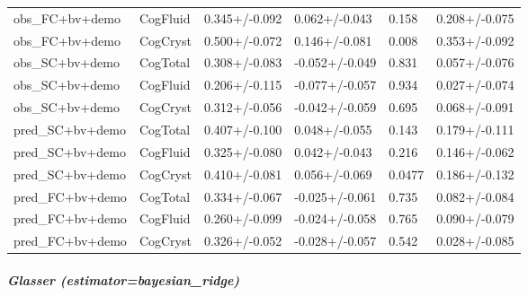{\begin{longtable}[]{@{}llllll@{}}
obs\_FC+bv+demo & CogFluid & 0.345+/-0.092 & 0.062+/-0.043 & 0.158 & 0.208+/-0.075 \\
obs\_FC+bv+demo & CogCryst & 0.500+/-0.072 & 0.146+/-0.081 & 0.008 & 0.353+/-0.092 \\
obs\_SC+bv+demo & CogTotal & 0.308+/-0.083 & -0.052+/-0.049 & 0.831 & 0.057+/-0.076 \\
obs\_SC+bv+demo & CogFluid & 0.206+/-0.115 & -0.077+/-0.057 & 0.934 & 0.027+/-0.074 \\
obs\_SC+bv+demo & CogCryst & 0.312+/-0.056 & -0.042+/-0.059 & 0.695 & 0.068+/-0.091 \\
pred\_SC+bv+demo & CogTotal & 0.407+/-0.100 & 0.048+/-0.055 & 0.143 & 0.179+/-0.111 \\
pred\_SC+bv+demo & CogFluid & 0.325+/-0.080 & 0.042+/-0.043 & 0.216 & 0.146+/-0.062 \\
pred\_SC+bv+demo & CogCryst & 0.410+/-0.081 & 0.056+/-0.069 & 0.0477 & 0.186+/-0.132 \\
pred\_FC+bv+demo & CogTotal & 0.334+/-0.067 & -0.025+/-0.061 & 0.735 & 0.082+/-0.084 \\
pred\_FC+bv+demo & CogFluid & 0.260+/-0.099 & -0.024+/-0.058 & 0.765 & 0.090+/-0.079 \\
pred\_FC+bv+demo & CogCryst & 0.326+/-0.052 & -0.028+/-0.057 & 0.542 & 0.028+/-0.085 \\
\end{longtable}
}

\subparagraph{Glasser (estimator=bayesian\_ridge)}\label{glasser-estimatorbayesian_ridge}

